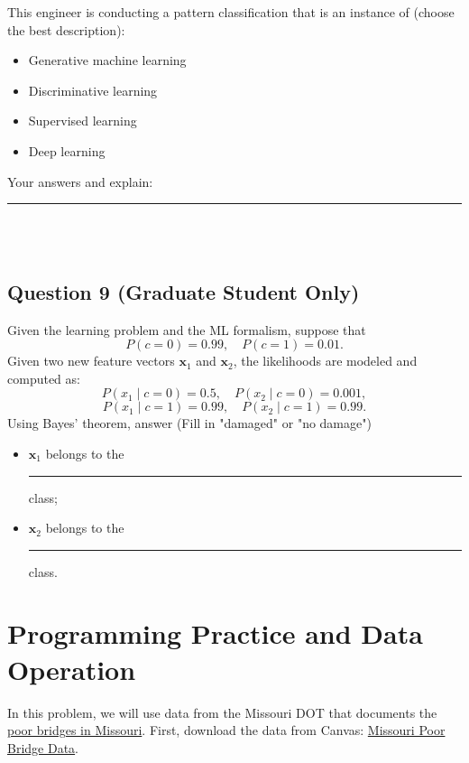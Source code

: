 \documentclass[12pt]{article}
\begin{document}
This engineer is conducting a pattern classification that is an instance of (choose the best description):
\begin{itemize}
    \item [A.] Generative machine learning
    \item [B.] Discriminative learning
    \item [C.] Supervised learning
    \item [D.] Deep learning
\end{itemize}
Your answers and explain: \rule{1in}{0.15mm}\\

\fullunderline \\

\fullunderline 

\bigskip

\subsection*{Question 9 (Graduate Student Only)} 

Given the learning problem and the ML formalism, suppose that
\[
P(c=0)=0.99, \quad P(c=1)=0.01.
\]
Given two new feature vectors \(\bm{x}_1\) and \(\bm{x}_2\), the likelihoods are modeled and computed as:
\[
P(x_1\mid c=0)=0.5, \quad P(x_2\mid c=0)=0.001,
\]
\[
P(x_1\mid c=1)=0.99, \quad P(x_2\mid c=1)=0.99.
\]
Using Bayes' theorem, answer (Fill in "damaged" or "no damage")
\begin{itemize}

    \item \(\bm{x}_1\) belongs to the \rule{1in}{0.15mm} class; 
    \item \(\bm{x}_2\) belongs to the \rule{1in}{0.15mm} class. 
 \end{itemize}





\newpage

\section*{Programming Practice and Data Operation}
In this problem, we will use data from the Missouri DOT that documents the \href{https://www.modot.org/Bridges}{poor bridges in Missouri}. First, download the data from Canvas: \href{https://umsystem.instructure.com/courses/407601/files/40569943?module_item_id=11752628}{Missouri Poor Bridge Data}.
\end{document}
